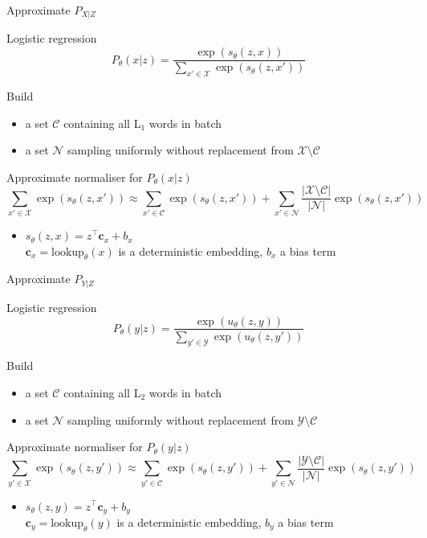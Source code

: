 \begin{frame}{Approximate $P_{X|Z}$}

Logistic regression
\begin{equation*}
P_\theta(x|z) = \frac{\exp(s_\theta(z, x))}{\sum_{x'\in \mathcal X} \exp(s_\theta(z, x'))}
\end{equation*}

\pause

Build
\begin{itemize}
	\item a set $\mathcal C$ containing all L$_1$ words in batch
	\item a set $\mathcal N$ sampling uniformly without replacement from $\mathcal X \setminus \mathcal C$
\end{itemize}

\pause 
Approximate normaliser for $P_\theta(x|z)$
\begin{equation*}
\sum_{x'\in \mathcal X} \exp(s_\theta(z, x')) \approx \sum_{x'\in \mathcal C} \exp(s_\theta(z, x')) + \sum_{x'\in \mathcal N} \frac{|\mathcal X \setminus \mathcal C|}{|\mathcal N|}\exp(s_\theta(z, x'))
\end{equation*}
\begin{itemize}
	\item $s_\theta(z, x) = z^\top \mathbf c_x + b_x$ \\
	$\mathbf c_x = \text{lookup}_\theta(x)$ is a deterministic embedding, $b_x$ a bias term
\end{itemize}

\end{frame}

\begin{frame}{Approximate $P_{Y|Z}$}

Logistic regression
\begin{equation*}
P_\theta(y|z) = \frac{\exp(u_\theta(z, y))}{\sum_{y'\in \mathcal Y} \exp(u_\theta(z, y'))}
\end{equation*}

\pause

Build
\begin{itemize}
	\item a set $\mathcal C$ containing all L$_2$ words in batch
	\item a set $\mathcal N$ sampling uniformly without replacement from $\mathcal Y \setminus \mathcal C$
\end{itemize}

\pause 
Approximate normaliser for $P_\theta(y|z)$
\begin{equation*}
\sum_{y'\in \mathcal X} \exp(s_\theta(z, y')) \approx \sum_{y'\in \mathcal C} \exp(s_\theta(z, y')) + \sum_{y'\in \mathcal N} \frac{|\mathcal Y \setminus \mathcal C|}{|\mathcal N|}\exp(s_\theta(z, y'))
\end{equation*}
\begin{itemize}
	\item $s_\theta(z, y) = z^\top \mathbf c_y + b_y$ \\
	$\mathbf c_y = \text{lookup}_\theta(y)$ is a deterministic embedding, $b_y$ a bias term
\end{itemize}

\end{frame}

